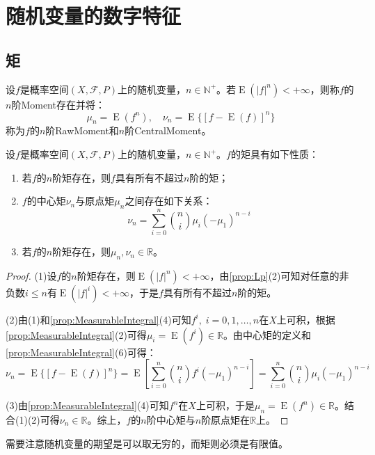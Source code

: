 \section{随机变量的数字特征}

\subsection{矩}
\begin{definition}
	设$f$是概率空间$(X,\mathscr{F},P)$上的随机变量，$n\in\mathbb{N}^+$。若$\operatorname{E}(|f|^n)<+\infty$，则称$f$的$n$阶\gls{Moment}存在并将：
	\begin{equation*}
		\mu_n=\operatorname{E}(f^n),\quad\nu_n=\operatorname{E}\{[f-\operatorname{E}(f)]^n\}
	\end{equation*}
	称为$f$的$n$阶\gls{RawMoment}和$n$阶\gls{CentralMoment}。
\end{definition}
\begin{property}\label{prop:Moment}
	设$f$是概率空间$(X,\mathscr{F},P)$上的随机变量，$n\in\mathbb{N}^+$。$f$的矩具有如下性质：
	\begin{enumerate}
		\item 若$f$的$n$阶矩存在，则$f$具有所有不超过$n$阶的矩；
		\item $f$的中心矩$\nu_n$与原点矩$\mu_n$之间存在如下关系：
		\begin{equation*}
			\nu_n=\sum_{i=0}^{n}\binom{n}{i}\mu_i(-\mu_1)^{n-i}
		\end{equation*}
		\item 若$f$的$n$阶矩存在，则$\mu_n,\nu_n\in\mathbb{R}$。
	\end{enumerate}
\end{property}
\begin{proof}
	(1)设$f$的$n$阶矩存在，则$\operatorname{E}(|f|^n)<+\infty$，由\cref{prop:Lp}(2)可知对任意的非负数$i\leqslant n$有$\operatorname{E}(|f|^i)<+\infty$，于是$f$具有所有不超过$n$阶的矩。\par
	(2)由(1)和\cref{prop:MeasurableIntegral}(4)可知$f^i,\;i=0,1,\dots,n$在$X$上可积，根据\cref{prop:MeasurableIntegral}(2)可得$\mu_i=\operatorname{E}(f^i)\in\mathbb{R}$。由中心矩的定义和\cref{prop:MeasurableIntegral}(6)可得：
	\begin{equation*}
		\nu_n
		=\operatorname{E}\{[f-\operatorname{E}(f)]^n\}
		=\operatorname{E}\left[\sum_{i=0}^{n}\binom{n}{i}f^i(-\mu_1)^{n-i}\right]
		=\sum_{i=0}^{n}\binom{n}{i}\mu_i(-\mu_1)^{n-i}
	\end{equation*}\par
	(3)由\cref{prop:MeasurableIntegral}(4)可知$f^n$在$X$上可积，于是$\mu_n=\operatorname{E}(f^n)\in\mathbb{R}$。结合(1)(2)可得$\nu_n\in\mathbb{R}$。综上，$f$的$n$阶中心矩与$n$阶原点矩在$\mathbb{R}$上。
\end{proof}
\begin{note}
	需要注意随机变量的期望是可以取无穷的，而矩则必须是有限值。
\end{note}

